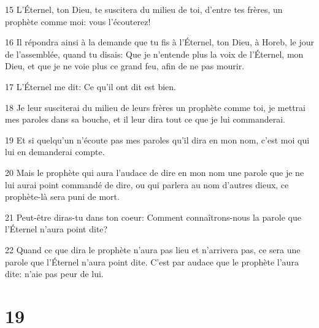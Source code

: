 \par 15 L'Éternel, ton Dieu, te suscitera du milieu de toi, d'entre tes frères, un prophète comme moi: vous l'écouterez!
\par 16 Il répondra ainsi à la demande que tu fis à l'Éternel, ton Dieu, à Horeb, le jour de l'assemblée, quand tu disais: Que je n'entende plus la voix de l'Éternel, mon Dieu, et que je ne voie plus ce grand feu, afin de ne pas mourir.
\par 17 L'Éternel me dit: Ce qu'il ont dit est bien.
\par 18 Je leur susciterai du milieu de leurs frères un prophète comme toi, je mettrai mes paroles dans sa bouche, et il leur dira tout ce que je lui commanderai.
\par 19 Et si quelqu'un n'écoute pas mes paroles qu'il dira en mon nom, c'est moi qui lui en demanderai compte.
\par 20 Mais le prophète qui aura l'audace de dire en mon nom une parole que je ne lui aurai point commandé de dire, ou qui parlera au nom d'autres dieux, ce prophète-là sera puni de mort.
\par 21 Peut-être diras-tu dans ton coeur: Comment connaîtrons-nous la parole que l'Éternel n'aura point dite?
\par 22 Quand ce que dira le prophète n'aura pas lieu et n'arrivera pas, ce sera une parole que l'Éternel n'aura point dite. C'est par audace que le prophète l'aura dite: n'aie pas peur de lui.

\chapter{19}

